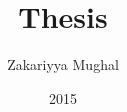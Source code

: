 \documentclass{scrartcl}
\begin{document}
\title{Thesis} %
\author{Zakariyya Mughal}
\date{2015} %

\maketitle
\tableofcontents

%
%




\end{document}
